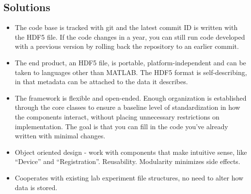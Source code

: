 \documentclass[10pt]{exam}
\begin{document}
	\subsection{Solutions}
		\begin{itemize}
			\item The code base is tracked with git and the latest commit ID is written with the HDF5 file. If the code changes in a year, you can still run code developed with a previous version by rolling back the repository to an earlier commit. 
			\item The end product, an HDF5 file, is portable, platform-independent and can be taken to languages other than MATLAB. The HDF5 format is self-describing, in that metadata can be attached to the data it describes.
			\item The framework is flexible and open-ended. Enough organization is established through the core classes to ensure a baseline level of standardization in how the components interact, without placing unnecessary restrictions on implementation. The goal is that you can fill in the code you've already written with minimal changes.
			\item Object oriented design - work with components that make intuitive sense, like ``Device'' and ``Registration''. Reusability. Modularity minimizes side effects.
			\item Cooperates with existing lab experiment file structures, no need to alter how data is stored.
		\end{itemize}
	
\end{document}
